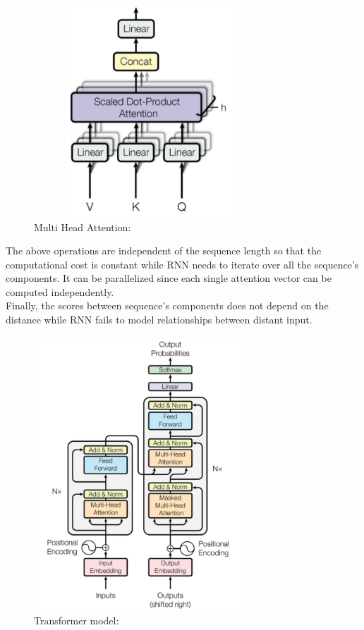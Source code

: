 \documentclass[LaM,binding=0.6cm]{sapthesis}
\begin{document}
\begin{figure}[H]  \centering
	\includegraphics[width=80mm,scale=0.7]{mhsa}
	\caption{Multi Head Attention: \cite{aiayn}}
	\label{fig:mhsa}
\end{figure}
The above operations are independent of the sequence length so that the computational cost is constant while RNN needs to iterate over all the sequence's components. It can be parallelized since each single attention vector can be computed independently.\\Finally, the scores between sequence's components does not depend on the distance while RNN fails to model relationships between distant input.
\begin{figure}[H]  \centering
	\includegraphics[width=80mm,scale=1]{transflay}
	\caption{Transformer model: \cite{aiayn}}
	\label{fig:tramodel}
\end{figure}
\end{document}

